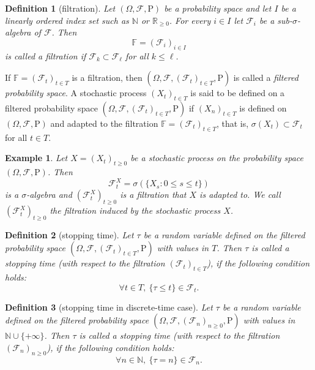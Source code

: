 \documentclass{article}
\newtheorem{definition}{Definition}[section]
\newtheorem{example}{Example}[section]
\theoremstyle{nonumberplain}
\begin{document}
\begin{definition}[filtration]
Let $(\Omega,\mathcal{F},\mathrm{P})$ be a probability space and let $I$ be a linearly ordered index set such as $\mathbb{N}$ or $\mathbb{R}_{\ge 0}$. For every $i\in I$ let $\mathcal{F}_{i}$ be a sub-$\sigma$-algebra of $\mathcal{F}$. Then
\[
\mathbb{F} =(\mathcal{F}_{i})_{i\in I}
\]
is called a \emph{filtration} if $\mathcal {F}_{k}\subset \mathcal{F}_{\ell}$ for all $k\leq \ell$. 
\end{definition}
If $ \mathbb {F}=(\mathcal{F}_{t})_{t\in T }$ is a filtration, then $(\Omega,\mathcal{F},(\mathcal{F}_{t})_{t\in T },\mathrm{P})$ is called a \emph{filtered probability space}. A stochastic process $(X_{t})_{t\in T }$ is said to be defined on a filtered probability space $(\Omega,\mathcal{F},(\mathcal{F}_{t})_{t\in T },\mathrm{P})$ if $(X_{n})_{t\in T }$ is defined on $(\Omega,\mathcal{F},\mathrm{P})$ and adapted to the filtration $\mathbb{F} =(\mathcal{F}_{t})_{t\in T }$, that is, $\sigma(X_t)\subset \mathcal{F}_t$ for all $t\in T$.

\begin{example}
	Let $X=(X_{t})_{t\ge 0}$ be a stochastic process on the probability space $(\Omega,\mathcal{F},\mathrm{P})$. Then 
	\[
	{\mathcal {F}}_{t}^X=\sigma (\{X_{s}:0\le s\le t\})
	\]
	is a $\sigma$-algebra and $(\mathcal {F}_{t}^X)_{t\ge0} $ is a filtration that $X$ is adapted to. We call $(\mathcal {F}_{t}^X)_{t\ge0} $ the filtration induced by the stochastic process $X$.
\end{example}

\begin{definition}[stopping time]
Let $\tau$  be a random variable defined on the filtered probability space $(\Omega,\mathcal{F},(\mathcal{F}_{t})_{t\in T },\mathrm{P})$ with values in $T$. Then $\tau$  is called a \emph{stopping time} (with respect to the filtration $(\mathcal{F}_{t})_{t\in T}$), if the following condition holds:
\[
\forall t\in T,\ \{\tau \leq t\}\in {\mathcal {F}}_{t}.
\]
\end{definition}

\begin{definition}[stopping time in discrete-time case]
	Let $\tau$  be a random variable defined on the filtered probability space $(\Omega,\mathcal{F},(\mathcal{F}_{n})_{n\ge0},\mathrm{P})$ with values in $\mathbb{N}\cup\{+\infty\}$. Then $\tau$  is called a stopping time (with respect to the filtration $(\mathcal{F}_{n})_{n\ge 0}$), if the following condition holds:
	\[
	\forall n\in\mathbb{N},\ \{\tau =n\}\in {\mathcal {F}}_{n}.
	\]
\end{definition}
\end{document}
